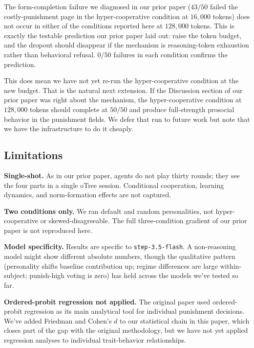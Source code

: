 \documentclass[12pt, a4paper]{article}
\begin{document}
The form-completion failure we diagnosed in our prior paper ($43/50$ failed the costly-punishment page in the hyper-cooperative condition at $16{,}000$ tokens) does not occur in either of the conditions reported here at $128{,}000$ tokens. This is exactly the testable prediction our prior paper laid out: raise the token budget, and the dropout should disappear if the mechanism is reasoning-token exhaustion rather than behavioral refusal. $0/50$ failures in each condition confirms the prediction.

This does mean we have not yet re-run the hyper-cooperative condition at the new budget. That is the natural next extension. If the Discussion section of our prior paper was right about the mechanism, the hyper-cooperative condition at $128{,}000$ tokens should complete at $50/50$ and produce full-strength prosocial behavior in the punishment fields. We defer that run to future work but note that we have the infrastructure to do it cheaply.

\subsection{Limitations}

\textbf{Single-shot.} As in our prior paper, agents do not play thirty rounds; they see the four parts in a single oTree session. Conditional cooperation, learning dynamics, and norm-formation effects are not captured.

\textbf{Two conditions only.} We ran default and random personalities, not hyper-cooperative or skewed-disagreeable. The full three-condition gradient of our prior paper is not reproduced here.

\textbf{Model specificity.} Results are specific to \texttt{step-3.5-flash}. A non-reasoning model might show different absolute numbers, though the qualitative pattern (personality shifts baseline contribution up; regime differences are large within-subject; punish-high voting is zero) has held across the models we've tested so far.

\textbf{Ordered-probit regression not applied.} The original paper used ordered-probit regression as its main analytical tool for individual punishment decisions. We've added Friedman and Cohen's $d$ to our statistical chain in this paper, which closes part of the gap with the original methodology, but we have not yet applied regression analyses to individual trait-behavior relationships.

\end{document}
